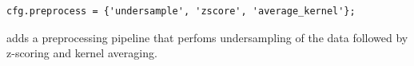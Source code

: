 \documentclass[utf8]{frontiersSCNS} %
\newcommand{\ttt}[1]{\texttt{#1}}
\begin{document}
\begin{verbatim}
cfg.preprocess = {'undersample', 'zscore', 'average_kernel'};
\end{verbatim}

adds a preprocessing pipeline that perfoms undersampling of the data followed by z-scoring and kernel averaging.






\end{document}
